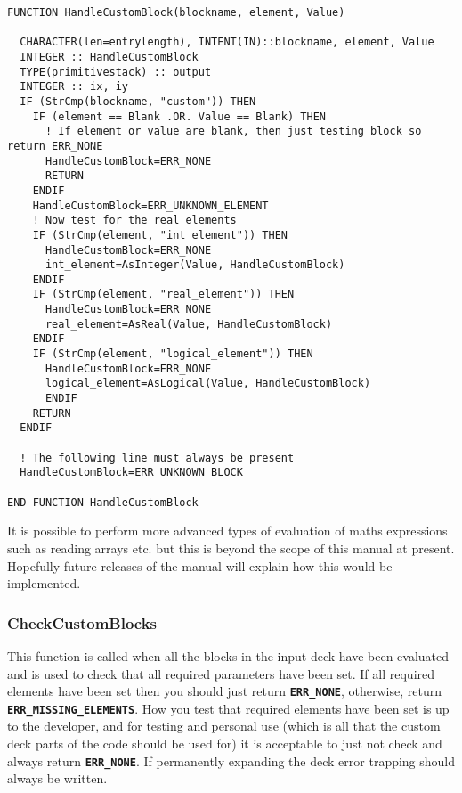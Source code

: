 \documentclass[12pt,a4paper]{article}
\newcommand{\simpleboxverbatim}{\begin{Verbatim}[obeytabs=true,frame=single,
  framerule=0.5mm,rulecolor=\color{warwickmid},formatcom=\color{black}]}
\newcommand{\inlinecode}[1]{{\color{warwickred} \bf\texttt{#1}}}
\begin{document}
\simpleboxverbatim
FUNCTION HandleCustomBlock(blockname, element, Value)

  CHARACTER(len=entrylength), INTENT(IN)::blockname, element, Value
  INTEGER :: HandleCustomBlock
  TYPE(primitivestack) :: output
  INTEGER :: ix, iy
  IF (StrCmp(blockname, "custom")) THEN
    IF (element == Blank .OR. Value == Blank) THEN
      ! If element or value are blank, then just testing block so return ERR_NONE
      HandleCustomBlock=ERR_NONE
      RETURN
    ENDIF
    HandleCustomBlock=ERR_UNKNOWN_ELEMENT
    ! Now test for the real elements
    IF (StrCmp(element, "int_element")) THEN
      HandleCustomBlock=ERR_NONE
      int_element=AsInteger(Value, HandleCustomBlock)
    ENDIF
    IF (StrCmp(element, "real_element")) THEN
      HandleCustomBlock=ERR_NONE
      real_element=AsReal(Value, HandleCustomBlock)
    ENDIF
    IF (StrCmp(element, "logical_element")) THEN
      HandleCustomBlock=ERR_NONE
      logical_element=AsLogical(Value, HandleCustomBlock)
      ENDIF
    RETURN
  ENDIF

  ! The following line must always be present
  HandleCustomBlock=ERR_UNKNOWN_BLOCK

END FUNCTION HandleCustomBlock
\end{Verbatim}

It is possible to perform more advanced types of evaluation of maths
expressions such as reading arrays etc. but this is beyond the scope of this
manual at present. Hopefully future releases of the manual will explain how
this would be implemented.

\subsubsection{CheckCustomBlocks}
This function is called when all the blocks in the input deck have been
evaluated and is used to check that all required parameters have been set. If
all required elements have been set then you should just return
\inlinecode{ERR\_NONE}, otherwise, return
\inlinecode{ERR\_MISSING\_ELEMENTS}. How you test that required elements have
been set is up to the developer, and for testing and personal use (which is
all that the custom deck parts of the code should be used for) it is
acceptable to just not check and always return \inlinecode{ERR\_NONE}. If
permanently expanding the deck error trapping should always be written.


\end{document}
